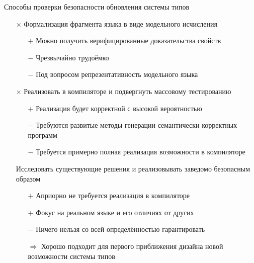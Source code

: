 \documentclass[usenames, dvipsnames]{beamer}
\begin{document}
    \begin{frame}[fragile]{Способы проверки безопасности обновления системы типов}
        \begin{itemize}
            \item[$\times$] Формализация фрагмента языка в виде модельного исчисления
            \begin{itemize}
                \item[$+$] Можно получить верифицированные доказательства свойств
                \item[$-$] Чрезвычайно трудоёмко
                \item[$-$] Под вопросом репрезентативность модельного языка
            \end{itemize}
            \item[$\times$] Реализовать в компиляторе и подвергнуть массовому тестированию
            \begin{itemize}
                \item[$+$] Реализация будет корректной с высокой вероятностью
                \item[$-$] Требуются развитые методы генерации семантически корректных программ
                \item[$-$] Требуется примерно полная реализация возможности в компиляторе
            \end{itemize}
            \item[\checkmark] Исследовать существующие решения и реализовывать заведомо безопасным образом
            \begin{itemize}
                \item[$+$] Априорно не требуется реализация в компиляторе
                \item[$+$] Фокус на реальном языке и его отличиях от других
                \item[$-$] Ничего нельзя со всей определённостью гарантировать
                \item[$\Rightarrow$] Хорошо подходит для первого приближения дизайна новой возможности системы типов
            \end{itemize}
        \end{itemize}
    \end{frame}
\end{document}
